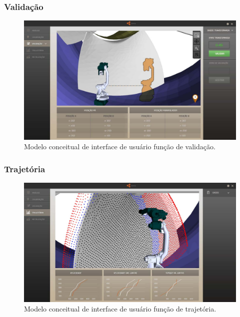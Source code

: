 \documentclass[12pt,a4paper]{article}
\begin{document}
\subsubsection {Validação}

\begin{figure}[H]
\begin{center}
  \includegraphics[width=.95\columnwidth]{figs/Validacao.jpg}
  \caption{Modelo conceitual de interface de usuário função de validação.}
  \label{fig:Interface_validacao}
\end{center}
\end{figure} 

\subsubsection {Trajetória}

\begin{figure}[H]
\begin{center}
  \includegraphics[width=\columnwidth]{figs/Trajetoria.jpg}
  \caption{Modelo conceitual de interface de usuário função de trajetória.}
  \label{fig:Interface_trajetoria}
\end{center}
\end{figure} 
\end{document}
